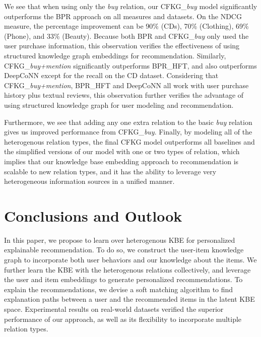 \documentclass[algorithms,article,accept,moreauthors,pdftex,10pt,a4paper]{Definitions/mdpi}
\begin{document}
We see that when using only the \textit{buy} relation, our CFKG\_\textit{buy} model significantly outperforms the BPR approach on all measures and datasets. On the NDCG measure, the percentage improvement can be 90\% (CDs), 70\% (Clothing), 69\% (Phone), and 33\% (Beauty). Because both BPR and CFKG\_\textit{buy} only used the user purchase information, this observation verifies the effectiveness of using structured knowledge graph embeddings for recommendation. Similarly, CFKG\_\textit{buy+mention} significantly outperforms BPR\_HFT, and also outperforms DeepCoNN except for the recall on the CD dataset. Considering that CFKG\_\textit{buy+mention}, BPR\_HFT and DeepCoNN all work with user purchase history plus textual reviews, this observation further verifies the advantage of using structured knowledge graph for user modeling and recommendation.

Furthermore, we see that adding any one extra relation to the basic \textit{buy} relation gives us improved performance from CFKG\_\textit{buy}. Finally, by modeling all of the heterogenous relation types, the final CFKG model outperforms all baselines and the simplified versions of our model with one or two types of relation, which implies that our knowledge base embedding approach to recommendation is scalable to new relation types, and it has the ability to leverage very heterogeneous information sources in a unified manner.

\fi





\section{Conclusions and Outlook}\label{sec:conclusions}


In this paper, we propose to learn over heterogenous KBE for personalized explainable recommendation. To do so, we construct the user-item knowledge graph to incorporate both user behaviors and our knowledge about the items. We further learn the KBE with the heterogenous relations collectively, and leverage the user and item embeddings to generate personalized recommendations. To explain the recommendations, we devise a soft matching algorithm to find explanation paths between a user and the recommended items in the latent KBE space.
Experimental results on real-world datasets verified the superior performance of our approach, as well as its flexibility to incorporate multiple relation types.
\end{document}

